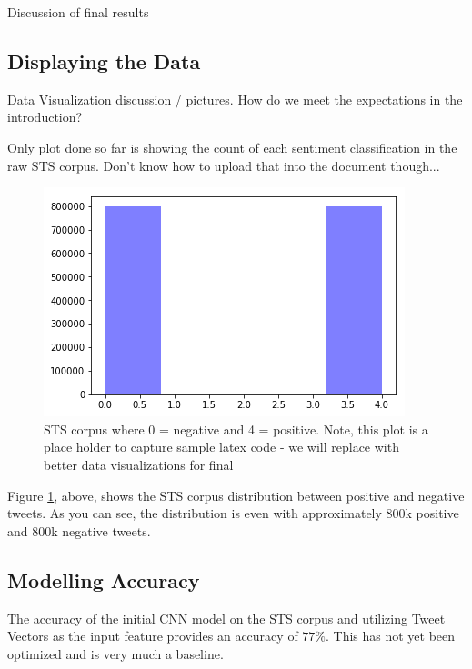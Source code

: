 \documentclass[11pt]{article}
\begin{document}
Discussion of final results

\subsection{Displaying the Data}

Data Visualization discussion / pictures.  How do we meet the expectations 
in the introduction?

Only plot done so far is showing the count of each sentiment classification in the 
raw STS corpus. Don't know how to upload that into the document though...


\begin{figure}
  \includegraphics[width=\linewidth]{sts_corpus.png}
  \caption{STS corpus where 0 = negative and 4 = positive.  
  Note, this plot is a place holder to capture sample latex code - we 
  will replace with better data visualizations for final}
  \label{fig:STS_corpus}
\end{figure}

Figure \ref{fig:STS_corpus}, above, shows the STS corpus distribution 
between positive and negative tweets.  As you can see, the distribution 
is even with approximately 800k positive and 800k negative tweets.


\subsection{Modelling Accuracy}

The accuracy of the initial CNN model on the STS corpus and utilizing Tweet 
Vectors as the input feature provides an accuracy of \(77\%\). This has not 
yet been optimized and is very much a baseline.
\end{document}
